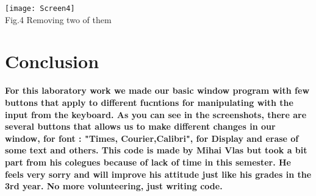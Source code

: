 \documentclass[12pt]{article}
\begin{document}
        \begin{minipage}[b]{1.0\linewidth}
      \begin{center}
        \texttt{[image: Screen4]}
         \\ Fig.4 Removing two of them
      \end{center}
    \end{minipage}
\section{Conclusion}

\textbf{For this laboratory work we made our basic window program with few buttons that apply to different fucntions for manipulating with the input from the keyboard. As you can see in the screenshots, there are several buttons that allows us to make different changes in our window, for font : "Times, Courier,Calibri", for Display and erase of some text and others. This code is made by Mihai Vlas but took a bit part from his colegues because of lack of time in this semester. He feels very sorry and will improve his attitude just like his grades in the 3rd year. No more volunteering, just writing code.}

  
\end{document}
